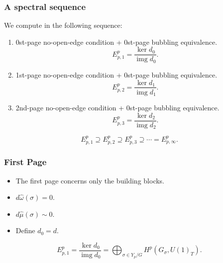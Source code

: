 \documentclass[xcolor=table, 11pt, aspectratio=169]{beamer}
\DeclareMathOperator{\img}{img}
\begin{document}
\begin{frame}
  \frametitle{A spectral sequence}
  We compute in the following sequence:
  \begin{enumerate}
  \item 0st-page no-open-edge condition + 0st-page bubbling equivalence.
  \[E^p_{p,1}=\frac{\ker d_0}{\img d_0}.\]
  \item 1st-page no-open-edge condition + 0st-page bubbling equivalence.
  \[E^p_{p,2}=\frac{\ker d_1}{\img d_1}.\]
  \item 2nd-page no-open-edge condition + 0st-page bubbling equivalence.
  \[E^p_{p,3}=\frac{\ker d_2}{\img d_2}.\]
  \end{enumerate}
  
  \[E^p_{p,1}\supseteq E^p_{p,2}\supseteq E^p_{p,3}\supseteq\cdots=E^p_{p,\infty}.\]
  \end{frame}
  
  \begin{frame}
  \frametitle{First Page}
  \begin{center}
  \end{center}
  \begin{itemize}
  \item The first page concerns only the building blocks.
  \item $d\hat\omega(\sigma)=0$.
  \item $d\hat\mu(\sigma)\sim0$.
  \item Define $d_0=d$.
  \end{itemize}
  \[E^p_{p,1}=\frac{\ker d_0}{\img d_0}
  =\bigoplus_{\sigma\in Y_p/G}H^p(G_\sigma, U(1)_T).\]
  \end{frame}
  
\end{document}
